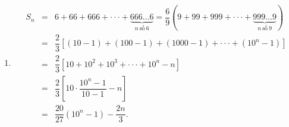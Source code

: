 \begin{bt}
{\begin{enumerate}
\begin{itemize}
			\end{itemize}	
			Vậy $S_n=\dfrac{9}{8}\left(9^n-1\right)+\dfrac{9^n-1}{8\cdot9^n}+2n=\dfrac{\left(9^n-1\right)\left(9^{n+1}+1\right)}{8\cdot9^n}+2n$.
			\item \begin{eqnarray*} S_n&=&6+66+666+\cdot\cdot\cdot+\underbrace{666...6}_{n~\text{số}~ 6}=\dfrac{6}{9}\left(9+99+999+\cdot\cdot\cdot+\underbrace{999...9}_{n~\text{số}~ 9}\right) \\
				&=&\dfrac{2}{3}\left[(10-1)+(100-1)+(1000-1)+\cdot\cdot\cdot+(10^n-1)\right]\\
				&=&\dfrac{2}{3}\left[10+10^2+10^3+\cdot\cdot\cdot+10^n-n\right]\\
				&=&\dfrac{2}{3}\left[10\cdot\dfrac{10^n-1}{10-1}-n\right]\\
				&=&\dfrac{20}{27}\left(10^n-1\right)-\dfrac{2n}{3}.
			\end{eqnarray*}
		\end{enumerate}
	}	
\end{bt}

